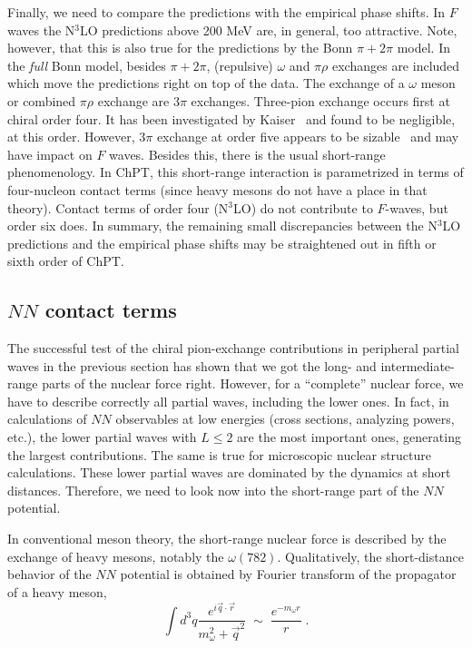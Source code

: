 \documentclass[sort&compress,preprint,3p]{elsarticle}
\begin{document}
Finally, we need to compare the
predictions with the empirical phase shifts.
In $F$ waves the N$^3$LO predictions above 200 MeV are,
in general, too attractive. Note, however, that this is
also true for the predictions by the Bonn $\pi + 2\pi$
model. In the {\it full} Bonn model, 
besides $\pi+2\pi$, 
(repulsive)
$\omega$ and $\pi\rho$ exchanges are included
which move
the predictions right on top of the data.
The exchange of a $\omega$ meson or  combined $\pi\rho$
exchange are $3\pi$ exchanges.
Three-pion exchange occurs first at chiral order four.
It has been investigated by Kaiser~\cite{Kai00a,Kai00b} and found to be
negligible, at this order.
However, $3\pi$ exchange at order five appears 
to be sizable~\cite{Kai01}
and may have impact on $F$ waves.
Besides this, there is the usual short-range phenomenology.
In ChPT, this short-range interaction
is parametrized in terms of four-nucleon contact terms
(since heavy mesons do not have a place in that theory).
Contact terms of order four (N$^3$LO) do not contribute to
$F$-waves, but order six does.
In summary, the remaining small 
discrepancies between the N$^3$LO predictions and the empirical
phase shifts may be straightened out in
fifth or sixth order of ChPT.



\subsection{$NN$ contact terms \label{sec_ct}}

The successful test of the chiral pion-exchange contributions
in peripheral partial waves in the previous section
has shown that we got the long- and intermediate-range
parts of the nuclear force right.
However, for a ``complete'' nuclear force, we have to 
describe correctly all partial waves, including the lower ones.
In fact, in calculations of $NN$ observables at low energies (cross
sections, analyzing powers, etc.),
the lower partial
waves with $L\leq 2$ are the most important ones, generating
the largest contributions.
The same is true for microscopic nuclear structure
calculations.
These lower partial waves are dominated by the
dynamics at short distances.
Therefore, we need to look now into the short-range part
of the $NN$ potential.

In conventional meson theory, the short-range nuclear force
is described by the exchange of heavy mesons, notably the
$\omega(782)$. 
Qualitatively, the short-distance behavior of the $NN$ 
potential is obtained
by Fourier transform of the propagator of
a heavy meson,
\begin{equation}
\int d^3q \frac{e^{i{\vec q} \cdot {\vec r}}}{m^2_\omega
+ {\vec q}^2} \;
\sim \;
 \frac{e^{-m_\omega r}}{r} \; .
\end{equation}
\end{document}
